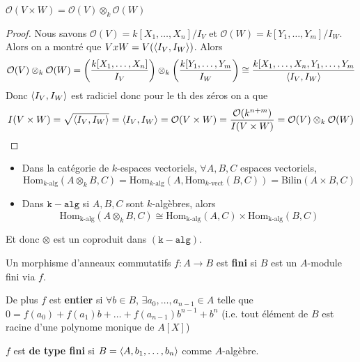 \begin{corollary}{}
    \(\mathcal{O}{(V \times  W)} = \mathcal{O}{(V)} \otimes_k \mathcal{O}{(W)}\) 
\end{corollary}
\begin{proof}{}
    Nous savons \(\mathcal{O}{(V)} = k[X_{1}, \dots, X_n] / I_V\) et
    \(\mathcal{O}{(W)} = k[Y_{1}, \dots, Y_m] / I_W\). Alors on a montré que \(V
    x W = V{({\left\langle I_V, I_W\right\rangle} )} \). Alors
    \[
        \mathcal{O}{(V)} \otimes_k \mathcal{O}{(W)} = {\left( \frac{k[X_{1},
            \dots, X_n]}{I_V}\right)} \otimes_k {\left( \frac{k[Y_{1}, \dots,
        Y_m}{I_W} \right)} \cong \frac{k[X_{1}, \dots, X_{n}, Y_{1}, \dots,
    Y_m}{{\left\langle I_V, I_W\right\rangle} }
    \]
    Donc \({\left\langle I_V, I_W\right\rangle} \) est radiciel donc pour le th des zéros on a que
    \[
      I{(V \times  W)} = \sqrt{{\left\langle I_V, I_W\right\rangle} } = {\left\langle I_V, I_W\right\rangle} =
      \mathcal{O}{(V \times  W)} = \frac{\mathcal{O}{(k^{n+m})}}{I{(V \times  W)}} =
      \mathcal{O}{(V)} \otimes_k \mathcal{O}{(W)}
    \]
\end{proof}

\begin{proposition}

    \begin{itemize}[label=\bullet] \( \) 
    \item Dans la catégorie de \(k\)-espaces vectoriels, \(\forall A, B, C\)
        espaces vectoriels, 
        \[
          \mathrm{Hom}_{k\text{-alg}} {(A \otimes_k B, C)} =
          \mathrm{Hom}_{k\text{-alg}} {(A, \mathrm{Hom}_{k\text{-vect}} {(B,
          C)})} = \mathrm{Bilin}{(A \times  B, C)}
        \]
    \item Dans \(\mathtt{k-alg}\) si \(A, B, C\) sont \(k\)-algèbres, alors
        \[
          \mathrm{Hom}_{\text{k-alg}} {(A \otimes_k B, C)} \cong
          \mathrm{Hom}_\text{k-alg} {(A, C)} \times  \mathrm{Hom}_\text{k-alg}
          {(B, C)}
        \]
\end{itemize}

Et donc \(\otimes\) est un coproduit dans \({(\mathtt{k-alg})}\).

    
\end{proposition}

\begin{definition}{}
    Un morphisme d'anneaux commutatifs \(f : A \to B\) est \textbf{fini} si
    \(B\) est un \(A\)-module fini via \(f\).

    De plus \(f\) est \textbf{entier} si \(\forall b \in B\), \(\exists a_{0},
    \dots, a_{n-1} \in A\) telle que \(0 = f{(a_{0})}+ f{(a_{1})}b + \dots +
    f{(a_{n-1} )}b^{n-1} + b^{n}\) (i.e. tout élément de \(B\) est racine d'une
    polynome monique de \(A[X]\))

    \(f\) est \textbf{de type fini} si \(B = {\left\langle A, b_{1}, \dots, b_{n}\right\rangle} \)
    comme \(A\)-algèbre.
\end{definition}

